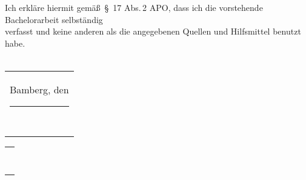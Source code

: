 \documentclass[
	11pt,
	german,
	singlespacing,
	parskip,
	nohyperref,
	consistentlayout,
]{PsiThesis}
\newcommand{\thesistype}{Bachelor}
\begin{document}
	
	


	\setlength\columnsep{2em}
	\begin{multicols}{2}
		\begin{refcontext}[sorting=nyt]
			\renewcommand*{\bibfont}{\small\RaggedRight}
			\linespread{1.0}\selectfont
			\printbibliography[heading=none]
		\end{refcontext}
	\end{multicols}

	\begin{declaration}
		\addchaptertocentry{\authorshipname}
		Ich erkläre hiermit gemä\ss\ \S~17 Abs.\,2 APO, dass ich die vorstehende {\thesistype}arbeit selbständig\\ verfasst und keine anderen als die angegebenen Quellen und Hilfsmittel benutzt habe.\\
		\bigskip
		\bigskip
		\\
		\begin{tabular}{@{}l@{}}
  		Bamberg, den \rule[-0.8em]{10em}{0.5pt}\\[2ex]
  		~
		\end{tabular}
		\hspace{\fill}%
		\begin{tabular}{@{}c@{}}
  			\rule[-0.8em]{20em}{0.5pt}\\[2ex]
  			\authorname
			\end{tabular}\hspace{\fill}
	\end{declaration}
\end{document}
